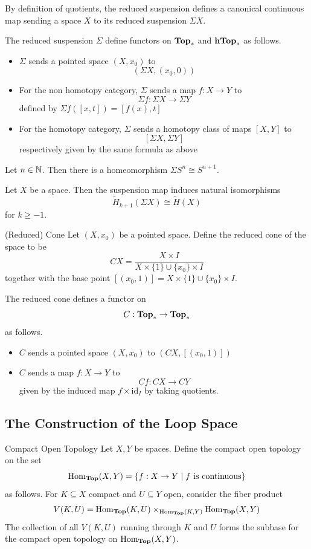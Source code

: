 \documentclass[a4paper]{article}
\begin{document}
By definition of quotients, the reduced suspension defines a canonical continuous map sending a space $X$ to its reduced suspension $\Sigma X$. 

\begin{prp}{}{} The reduced suspension $\Sigma$ define functors on $\bold{Top}_\ast$ and $\bold{hTop}_\ast$ as follows. 
\begin{itemize}
\item $\Sigma$ sends a pointed space $(X,x_0)$ to $$(\Sigma X,(x_0,0))$$
\item For the non homotopy category, $\Sigma$ sends a map $f:X\to Y$ to $$\Sigma f:\Sigma X\to\Sigma Y$$ defined by $\Sigma f([x,t])=[f(x),t]$
\item For the homotopy category, $\Sigma$ sends a homotopy class of maps $[X,Y]$ to $$[\Sigma X,\Sigma Y]$$ respectively given by the same formula as above
\end{itemize}
\end{prp}

\begin{prp}{}{} Let $n\in\mathbb{N}$. Then there is a homeomorphism $\Sigma S^n\cong S^{n+1}$. 
\end{prp}

\begin{prp}{}{} Let $X$ be a space. Then the suspension map induces natural isomorphisms $$\widetilde{H}_{k+1}(\Sigma X)\cong\widetilde{H}(X)$$ for $k\geq -1$. 
\end{prp}

\begin{defn}{(Reduced) Cone}{} Let $(X,x_0)$ be a pointed space. Define the reduced cone of the space to be $$CX=\frac{X\times I}{X\times\{1\}\cup\{x_0\}\times I}$$ together with the base point $[(x_0,1)]=X\times\{1\}\cup\{x_0\}\times I$. 
\end{defn}

\begin{prp}{}{} The reduced cone defines a functor on $$C:\bold{Top}_\ast\to\bold{Top}_\ast$$ as follows. 
\begin{itemize}
\item $C$ sends a pointed space $(X,x_0)$ to $(CX,[(x_0,1)])$
\item $C$ sends a map $f:X\to Y$ to $$Cf:CX\to CY$$ given by the induced map $f\times\text{id}_I$ by taking quotients. 
\end{itemize}
\end{prp}

\subsection{The Construction of the Loop Space}
\begin{defn}{Compact Open Topology}{} Let $X,Y$ be spaces. Define the compact open topology on the set $$\operatorname{Hom}_\bold{Top}(X,Y)=\{f:X\to Y\;|\;f\text{ is continuous}\}$$ as follows. For $K\subseteq X$ compact and $U\subseteq Y$ open, consider the fiber product $$V(K,U)=\operatorname{Hom}_\bold{Top}(K,U)\times_{\operatorname{Hom}_\bold{Top}(K,Y)}\operatorname{Hom}_\bold{Top}(X,Y)$$ The collection of all $V(K,U)$ running through $K$ and $U$ forms the subbase for the compact open topology on $\operatorname{Hom}_\bold{Top}(X,Y)$. 
\end{defn}
\end{document}
